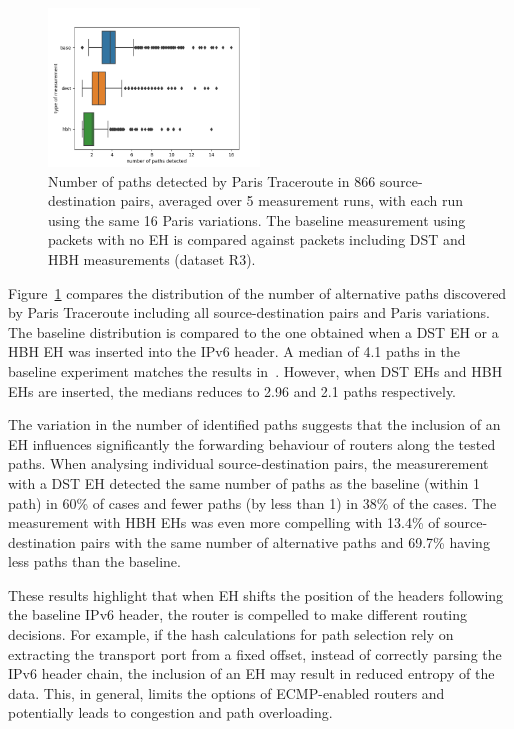 \documentclass[conference]{IEEEtran}
\begin{document}
\begin{figure}[t]
\centering
  \includegraphics[width=0.5\textwidth]{boxplot-paths-detected.png}
  \caption{Number of paths detected by Paris Traceroute in 866
source-destination pairs, averaged over 5 measurement runs, with each run using
the same 16 Paris variations. The baseline measurement using packets with no EH
is compared against packets including DST and HBH measurements (dataset R3).}
  \label{fig:paths-detected}
\end{figure}

Figure~\ref{fig:paths-detected} compares the distribution of the number of
alternative paths discovered by Paris Traceroute including all
source-destination pairs and Paris variations.  The baseline distribution is
compared to the one obtained when a DST EH or a HBH EH was inserted into the
IPv6 header.  A median of 4.1 paths in the baseline experiment matches the
results in~\cite{augustin2006avoiding}.  However, when DST EHs and HBH EHs are
inserted, the medians reduces to 2.96 and 2.1 paths respectively.  



The variation in the number of identified paths suggests that the inclusion of
an EH influences significantly the forwarding behaviour of routers along the
tested paths.  When analysing individual source-destination pairs, the
measurerement with a DST EH detected the same number of paths as the baseline
(within 1 path) in 60\% of cases and fewer paths (by less than 1) in 38\% of
the cases.  The measurement with HBH EHs was even more compelling with 13.4\%
of source-destination pairs with the same number of alternative paths and
69.7\% having less paths than the baseline.

These results highlight that when EH shifts the position of the headers
following the baseline IPv6 header, the router is compelled to make different
routing decisions.  For example, if the hash calculations for path selection
rely on extracting the transport port from a fixed offset, instead of correctly
parsing the IPv6 header chain, the inclusion of an EH may result in reduced
entropy of the data.  This, in general, limits the options of ECMP-enabled
routers and potentially leads to congestion and path overloading.
\end{document}
